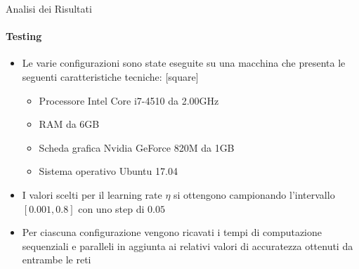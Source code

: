 \documentclass[
 ]{beamer}
\begin{document}
\begin{frame}{Analisi dei Risultati}
    \framesubtitle{Testing}
    \smallskip
    \begin{itemize} [<+->]
        \setlength\itemsep{1em}
        \item \large Le varie configurazioni sono state eseguite su una macchina che presenta le seguenti caratteristiche tecniche:       
        \bigskip
        [square] 
        \begin{itemize} [<+->] 
        \setlength\itemsep{1em}
            \item \large Processore Intel Core i7-4510 da 2.00GHz
            \item \large RAM da 6GB
            \item \large Scheda grafica Nvidia GeForce 820M da 1GB
            \item \large Sistema operativo Ubuntu 17.04                    
        \end{itemize} 
        \item \large I valori scelti per il learning rate $\eta$ si ottengono campionando l'intervallo $[0.001, 0.8]$ con uno step di $0.05$
        \item \large Per ciascuna configurazione vengono ricavati i tempi di computazione sequenziali e paralleli in aggiunta ai relativi valori di accuratezza ottenuti da entrambe le reti 
    \end{itemize}     
\end{frame}
\end{document}
